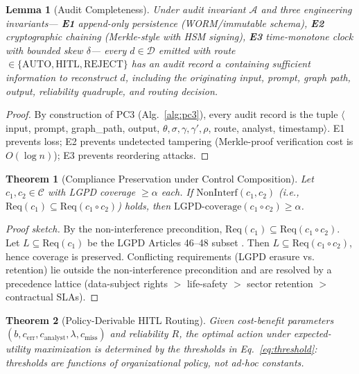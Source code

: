 \documentclass[journal]{IEEEtran}
\newtheorem{lemma}{Lemma}
\newtheorem{theorem}{Theorem}
\begin{document}
\begin{lemma}[Audit Completeness]
\label{lem:audit}
Under audit invariant $\mathcal{A}$ and three engineering invariants---%
\textbf{E1} append-only persistence (WORM/immutable schema),
\textbf{E2} cryptographic chaining (Merkle-style with HSM signing),
\textbf{E3} time-monotone clock with bounded skew $\delta$---%
every $d \in \mathcal{D}$ emitted with route $\in \{\text{AUTO},\text{HITL},\text{REJECT}\}$
has an audit record $a$ containing sufficient information to reconstruct $d$, including the
originating input, prompt, graph path, output, reliability quadruple, and routing decision.
\end{lemma}
\begin{proof}
By construction of PC3 (Alg.~\ref{alg:pc3}), every audit record is the tuple
$\langle$input, prompt, graph\_path, output, $\theta,\sigma,\gamma,\gamma',\rho$,
route, analyst, timestamp$\rangle$.
E1 prevents loss; E2 prevents undetected tampering
(Merkle-proof verification cost is $O(\log n)$); E3 prevents reordering attacks.
\end{proof}

\begin{theorem}[Compliance Preservation under Control Composition]
\label{thm:compliance}
Let $c_1, c_2 \in \mathcal{C}$ with LGPD coverage $\geq \alpha$ each. If
$\mathrm{NonInterf}(c_1, c_2)$ (i.e., $\mathrm{Req}(c_1) \subseteq \mathrm{Req}(c_1 \circ c_2)$)
holds, then $\mathrm{LGPD\text{-}coverage}(c_1 \circ c_2) \geq \alpha$.
\end{theorem}
\begin{proof}[Proof sketch]
By the non-interference precondition, $\mathrm{Req}(c_1) \subseteq \mathrm{Req}(c_1 \circ c_2)$.
Let $L \subseteq \mathrm{Req}(c_1)$ be the LGPD Articles 46--48 subset \cite{lgpd2018}.
Then $L \subseteq \mathrm{Req}(c_1 \circ c_2)$, hence coverage is preserved.
Conflicting requirements (LGPD erasure vs. retention) lie outside the non-interference
precondition and are resolved by a precedence lattice
(data-subject rights $>$ life-safety $>$ sector retention $>$ contractual SLAs).
\end{proof}

\begin{theorem}[Policy-Derivable HITL Routing]
\label{thm:routing}
Given cost-benefit parameters $(b, c_{\text{err}}, c_{\text{analyst}}, \lambda, c_{\text{miss}})$
and reliability $R$, the optimal action under expected-utility maximization is determined by the
thresholds in Eq.~\eqref{eq:threshold}: thresholds are functions of organizational policy,
not ad-hoc constants.
\end{theorem}
\end{document}
